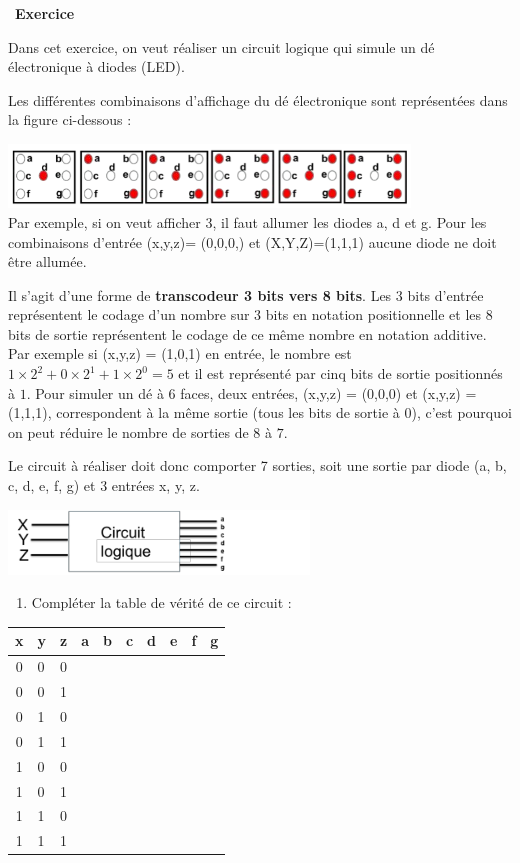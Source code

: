 \documentclass[
  11pt,
]{article}
\providecommand{\tightlist}{%
  \setlength{\itemsep}{0pt}\setlength{\parskip}{0pt}}
\newcounter{exo}
\newenvironment{exercice}[1]
{\par \medskip   \addtocounter{exo}{1} \noindent  
\begin{bclogo}[arrondi =0.1,   noborder = true, logo=\bccrayon, marge=4]{~\textbf{Exercice} \textbf{\theexo} {\itshape #1} }  \par}
{
\end{bclogo}
 \par \bigskip }
\newcounter{def}
\newcounter{logi}
\begin{document}
\begin{exercice}{}

Dans cet exercice, on veut réaliser un circuit logique qui simule un dé
électronique à diodes (LED).

Les différentes combinaisons d'affichage du dé électronique sont
représentées dans la figure ci-dessous :

\includegraphics[width=0.8\textwidth,height=\textheight]{images/faces_de.png}\\

Par exemple, si on veut afficher 3, il faut allumer les diodes a, d et
g. Pour les combinaisons d'entrée (x,y,z)= (0,0,0,) et (X,Y,Z)=(1,1,1)
aucune diode ne doit être allumée.

Il s'agit d'une forme de \textbf{transcodeur 3 bits vers 8 bits}. Les
\(3\) bits d'entrée représentent le codage d'un nombre sur \(3\) bits en
notation positionnelle et les \(8\) bits de sortie représentent le
codage de ce même nombre en notation additive. Par exemple si (x,y,z) =
(1,0,1) en entrée, le nombre est
\(1 \times 2^{2} + 0 \times 2^{1} + 1 \times 2^{0}=5\) et il est
représenté par cinq bits de sortie positionnés à \(1\). Pour simuler un
dé à 6 faces, deux entrées, (x,y,z) = (0,0,0) et (x,y,z) = (1,1,1),
correspondent à la même sortie (tous les bits de sortie à 0), c'est
pourquoi on peut réduire le nombre de sorties de \(8\) à \(7\).

Le circuit à réaliser doit donc comporter 7 sorties, soit une sortie par
diode (a, b, c, d, e, f, g) et 3 entrées x, y, z.

\includegraphics[width=0.6\textwidth,height=\textheight]{images/circuit-de.png}\\

\begin{enumerate}
\def\labelenumi{\arabic{enumi}.}
\tightlist
\item
  Compléter la table de vérité de ce circuit :
\end{enumerate}

\begin{longtable}[]{@{}clllllllll@{}}
\toprule
x & y & z & a & b & c & d & e & f & g\tabularnewline
\midrule
\endhead
0 & 0 & 0 & & & & & & &\tabularnewline
0 & 0 & 1 & & & & & & &\tabularnewline
0 & 1 & 0 & & & & & & &\tabularnewline
0 & 1 & 1 & & & & & & &\tabularnewline
1 & 0 & 0 & & & & & & &\tabularnewline
1 & 0 & 1 & & & & & & &\tabularnewline
1 & 1 & 0 & & & & & & &\tabularnewline
1 & 1 & 1 & & & & & & &\tabularnewline
\bottomrule
\end{longtable}


\end{exercice}
\end{document}
